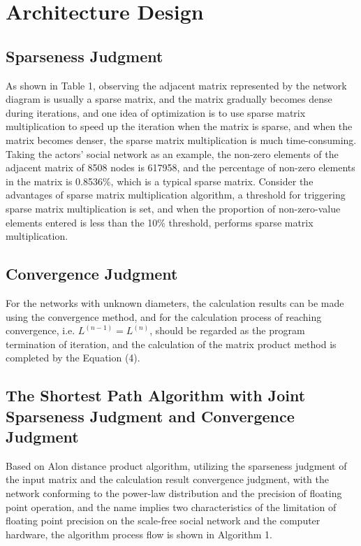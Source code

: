 \documentclass[review]{cvpr}
\begin{document}
\section{Architecture Design}

\subsection{Sparseness Judgment}

As shown in Table 1, observing the adjacent matrix represented by the network diagram is usually a sparse matrix, and the matrix gradually becomes dense during iterations,
and one idea of optimization is to use sparse matrix multiplication to speed up the iteration when the matrix is sparse, and when the matrix becomes denser, the sparse matrix multiplication is much time-consuming.
Taking the actors' social network as an example, the non-zero elements of the adjacent matrix of 8508 nodes is 617958, and the percentage of non-zero elements in the matrix is 0.8536\%, which is a typical sparse matrix.
Consider the advantages of sparse matrix multiplication algorithm, a threshold for triggering sparse matrix multiplication is set,
and when the proportion of non-zero-value elements entered is less than the 10\% threshold, performs sparse matrix multiplication.

\subsection{Convergence Judgment}

For the networks with unknown diameters, the calculation results can be made using the convergence method, and for the calculation process of reaching convergence,
i.e. $L^{(n-1)}=L^{(n)}$, should be regarded as the program termination of iteration, and the calculation of the matrix product method is completed by the Equation (4).

\subsection{The Shortest Path Algorithm with Joint Sparseness Judgment and Convergence Judgment}

Based on Alon \etal distance product algorithm, utilizing the sparseness judgment of the input matrix and the calculation result convergence judgment,
with the network conforming to the power-law distribution and the precision of floating point operation, and the name implies two characteristics of the limitation
of floating point precision on the scale-free social network and the computer hardware, the algorithm process flow is shown in Algorithm 1.
\end{document}
